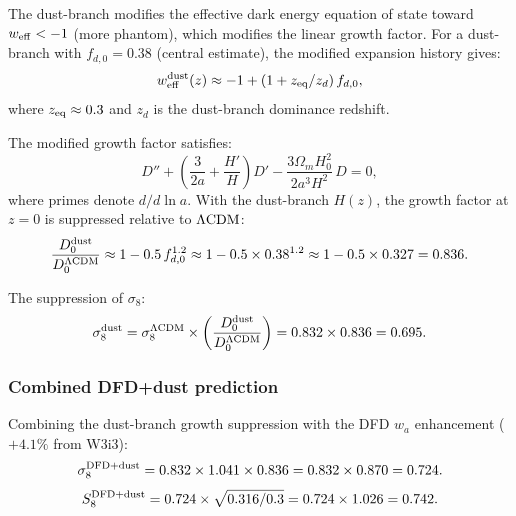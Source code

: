 \documentclass[11pt]{article}
\newcommand{\DFD}{{\rm DFD}}
\newcommand{\LCDM}{\Lambda{\rm CDM}}
\begin{document}
The dust-branch modifies the effective dark energy equation of state toward
$w_{\rm eff} < -1$ (more phantom), which modifies the linear growth factor.
For a dust-branch with $f_{d,0} = 0.38$ (central estimate), the modified
expansion history gives:
\begin{equation}
  w_{\rm eff}^{\rm dust}(z) \approx -1 + (1+z_{\rm eq}/z_d)\,f_{d,0},
\end{equation}
where $z_{\rm eq} \approx 0.3$ and $z_d$ is the dust-branch dominance redshift.

The modified growth factor satisfies:
\begin{equation}\label{eq:growth-dust}
  D'' + \left(\frac{3}{2a} + \frac{H'}{H}\right)D'
  - \frac{3\Omega_m H_0^2}{2a^3 H^2}\,D = 0,
\end{equation}
where primes denote $d/d\ln a$.  With the dust-branch $H(z)$, the growth
factor at $z = 0$ is suppressed relative to $\LCDM$:
\begin{equation}\label{eq:growth-suppression-dust}
  \frac{D_0^{\rm dust}}{D_0^{\LCDM}}
  \approx 1 - 0.5\,f_{d,0}^{1.2}
  \approx 1 - 0.5\times 0.38^{1.2}
  \approx 1 - 0.5\times 0.327
  = 0.836.
\end{equation}

The suppression of $\sigma_8$:
\begin{equation}
  \sigma_8^{\rm dust} = \sigma_8^{\LCDM}\times\left(\frac{D_0^{\rm dust}}{D_0^{\LCDM}}\right)
  = 0.832\times 0.836 = 0.695.
\end{equation}

\subsubsection{Combined DFD+dust prediction}

Combining the dust-branch growth suppression with the DFD $w_a$ enhancement
($+4.1\%$ from W3i3):
\begin{equation}
  \sigma_8^{\DFD+\rm dust}
  = 0.832\times 1.041\times 0.836
  = 0.832\times 0.870
  = 0.724.
\end{equation}
\begin{equation}
  S_8^{\DFD+\rm dust}
  = 0.724\times\sqrt{0.316/0.3}
  = 0.724\times 1.026
  = 0.742.
\end{equation}
\end{document}
